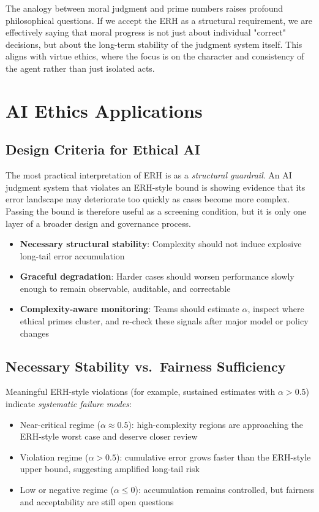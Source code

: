 \documentclass[12pt,a4paper]{article}
\theoremstyle{definition}
\theoremstyle{remark}
\begin{document}
The analogy between moral judgment and prime numbers raises profound philosophical questions. If we accept the ERH as a structural requirement, we are effectively saying that moral progress is not just about individual "correct" decisions, but about the long-term stability of the judgment system itself. This aligns with virtue ethics, where the focus is on the character and consistency of the agent rather than just isolated acts.

\section{AI Ethics Applications}
\label{sec:implications}

\subsection{Design Criteria for Ethical AI}

The most practical interpretation of ERH is as a \emph{structural guardrail}. An AI judgment system that violates an ERH-style bound is showing evidence that its error landscape may deteriorate too quickly as cases become more complex. Passing the bound is therefore useful as a screening condition, but it is only one layer of a broader design and governance process.

\begin{itemize}
    \item \textbf{Necessary structural stability}: Complexity should not induce explosive long-tail error accumulation
    \item \textbf{Graceful degradation}: Harder cases should worsen performance slowly enough to remain observable, auditable, and correctable
    \item \textbf{Complexity-aware monitoring}: Teams should estimate $\alpha$, inspect where ethical primes cluster, and re-check these signals after major model or policy changes
\end{itemize}

\subsection{Necessary Stability vs.\ Fairness Sufficiency}

Meaningful ERH-style violations (for example, sustained estimates with $\alpha > 0.5$) indicate \emph{systematic failure modes}:
\begin{itemize}
    \item Near-critical regime ($\alpha \approx 0.5$): high-complexity regions are approaching the ERH-style worst case and deserve closer review
    \item Violation regime ($\alpha > 0.5$): cumulative error grows faster than the ERH-style upper bound, suggesting amplified long-tail risk
    \item Low or negative regime ($\alpha \le 0$): accumulation remains controlled, but fairness and acceptability are still open questions
\end{itemize}
\end{document}

